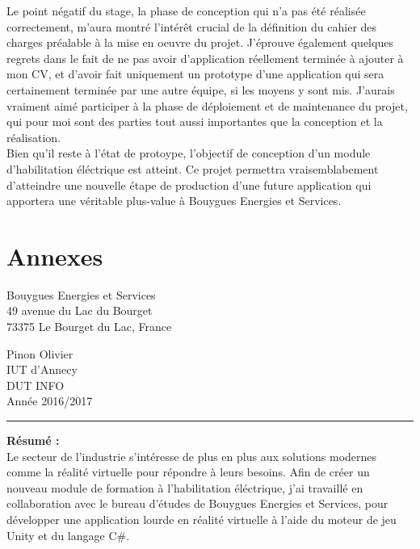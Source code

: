 \documentclass[a4paper]{article}
\begin{document}
    Le point négatif du stage, la phase de conception qui n'a pas été réalisée correctement, m'aura montré l'intérêt crucial de la définition du cahier des charges préalable à la mise en oeuvre du projet. J'éprouve également quelques regrets dans le fait de ne pas avoir d'application réellement terminée à ajouter à mon CV, et d'avoir fait uniquement un prototype d'une application qui sera certainement terminée par une autre équipe, si les moyens y sont mis. J'aurais vraiment aimé participer à la phase de déploiement et de maintenance du projet, qui pour moi sont des parties tout aussi importantes que la conception et la réalisation. \\

    Bien qu'il reste à l'état de protoype, l'objectif de conception d'un module d'habilitation éléctrique est atteint. Ce projet permettra vraisemblabement d'atteindre une nouvelle étape de production d'une future application qui apportera une véritable plus-value à Bouygues Energies et Services.

    \section{Annexes}
    
    \newpage 
    \normalsize
    \thispagestyle{empty}
    \noindent
    \begin{minipage}{.5\textwidth}
        Bouygues Energies et Services \\
        49 avenue du Lac du Bourget \\
        73375 Le Bourget du Lac, France
    \end{minipage}
    \begin{minipage}{.5\textwidth}
    \begin{flushright}
        Pinon Olivier \\
        IUT d'Annecy \\
        DUT INFO \\
        Année 2016/2017 \\
    \end{flushright}
    \end{minipage}

    \vspace{10pt}
    \noindent\rule{0.725\paperwidth}{0.4pt}
    
    \vfill 
    \begin{flushleft}
    \huge \textbf{Résumé : } \\
    \vspace{10pt}
    \normalsize Le secteur de l'industrie s'intéresse de plus en plus aux solutions modernes comme la réalité virtuelle pour répondre à leurs besoins. Afin de créer un nouveau module de formation à l'habilitation éléctrique, j'ai travaillé en collaboration avec le bureau d'études de Bouygues Energies et Services, pour développer une application lourde en réalité virtuelle à l'aide du moteur de jeu Unity et du langage C\#. \\
    \end{flushleft}
    
\end{document}
